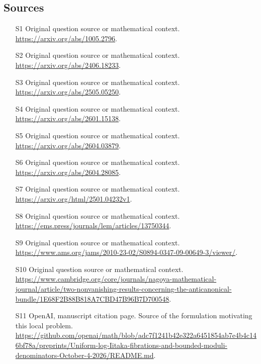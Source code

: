 \documentclass[11pt]{article}
\begin{document}
\subsection{Sources}
\begin{itemize}
\item[S1] Original question source or mathematical context.
\url{https://arxiv.org/abs/1005.2796}.
\item[S2] Original question source or mathematical context.
\url{https://arxiv.org/abs/2406.18233}.
\item[S3] Original question source or mathematical context.
\url{https://arxiv.org/abs/2505.05250}.
\item[S4] Original question source or mathematical context.
\url{https://arxiv.org/abs/2601.15138}.
\item[S5] Original question source or mathematical context.
\url{https://arxiv.org/abs/2604.03879}.
\item[S6] Original question source or mathematical context.
\url{https://arxiv.org/abs/2604.28085}.
\item[S7] Original question source or mathematical context.
\url{https://arxiv.org/html/2501.04232v1}.
\item[S8] Original question source or mathematical context.
\url{https://ems.press/journals/lem/articles/13750344}.
\item[S9] Original question source or mathematical context.
\url{https://www.ams.org/jams/2010-23-02/S0894-0347-09-00649-3/viewer/}.
\item[S10] Original question source or mathematical context.
\url{https://www.cambridge.org/core/journals/nagoya-mathematical-journal/article/two-nonvanishing-results-concerning-the-anticanonical-bundle/1E68F2B88B818A7CBD47B96B7D700548}.
\item[S11] OpenAI, manuscript citation page. Source of the formulation motivating this local problem.
\url{https://github.com/openai/math/blob/adc7f1241b42e322a6451854ab7e4b4c146bf78a/preprints/Uniform-log-Iitaka-fibrations-and-bounded-moduli-denominators-October-4-2026/README.md}.
\end{itemize}
\end{document}
